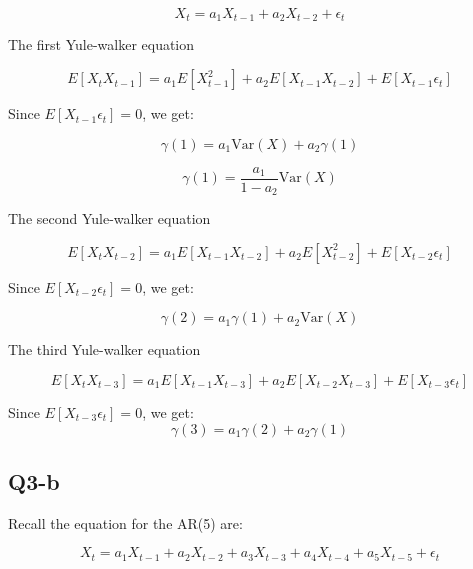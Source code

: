\documentclass{article} %
\begin{document}
\begin{equation}
 X_t = a_1 X_{t-1} + a_2 X_{t-2} + \epsilon_t
\end{equation}

The first Yule-walker equation

\begin{equation}
    E[X_t X_{t-1}] = a_1 E[X_{t-1}^2] + a_2 E[X_{t-1}X_{t-2}] + E[X_{t-1} \epsilon_t]
\end{equation}


Since \( E[X_{t-1} \epsilon_t] = 0 \), we get:

\begin{equation}
    \gamma(1) = a_1 \text{Var}(X) + a_2 \gamma(1)
\end{equation}

\begin{equation}
    \gamma(1) = \frac{a_1}{1 - a_2} \text{Var}(X)
\end{equation}


The second Yule-walker equation

\begin{equation}
    E[X_t X_{t-2}] = a_1 E[X_{t-1}X_{t-2}] + a_2 E[X_{t-2}^2] + E[X_{t-2} \epsilon_t]
\end{equation}

Since \( E[X_{t-2} \epsilon_t] = 0 \), we get:

\begin{equation}
    \gamma(2) = a_1 \gamma(1) + a_2 \text{Var}(X)
\end{equation}

The third Yule-walker equation

\begin{equation}
    E[X_t X_{t-3}] = a_1 E[X_{t-1}X_{t-3}] + a_2 E[X_{t-2}X_{t-3}] + E[X_{t-3} \epsilon_t]
\end{equation}

Since \( E[X_{t-3} \epsilon_t] = 0 \), we get:
\begin{equation}
    \gamma(3) = a_1 \gamma(2) + a_2 \gamma(1)
\end{equation}


\subsection{Q3-b}

Recall the equation for the AR(5) are: 

\begin{equation}
    X_t = a_1 X_{t-1} + a_2 X_{t-2} + a_3 X_{t-3} + a_4 X_{t-4} + a_5 X_{t-5} + \epsilon_t
\end{equation}
\end{document}
